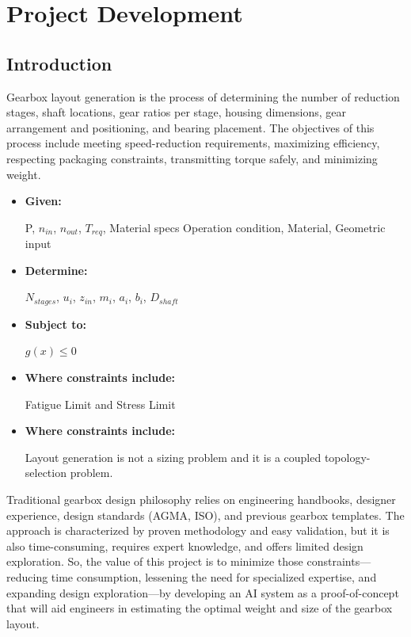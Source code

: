 \chapter{Project Development}
\section{Introduction}
    Gearbox layout generation is the process of determining the number of reduction stages, 
    shaft locations, gear ratios per stage, housing dimensions, gear arrangement and positioning, 
    and bearing placement. The objectives of this process include meeting speed-reduction 
    requirements, maximizing efficiency, respecting packaging constraints, transmitting torque 
    safely, and minimizing weight.

    \begin{itemize}
        \item \textbf{Given:}\par
            P, $n_{in}$, $n_{out}$, $T_{req}$, Material specs
            Operation condition, Material, Geometric input
        \item \textbf{Determine:}\par
            $N_{stages}$, $u_{i}$, $z_{in}$, $m_{i}$, $a_{i}$, $b_{i}$, $D_{shaft}$
        \item \textbf{Subject to:}\par
            $g(x) \le 0$
        \item \textbf{Where constraints include:}\par
            Fatigue Limit and Stress Limit
        \item \textbf{Where constraints include:}\par
            Layout generation is not a sizing problem and it is a coupled topology-selection problem.
    \end{itemize}

    Traditional gearbox design philosophy relies on engineering handbooks, designer experience, 
    design standards (AGMA, ISO), and previous gearbox templates. The approach is characterized by 
    proven methodology and easy validation, but it is also time-consuming, requires expert knowledge, 
    and offers limited design exploration. So, the value of this project is to minimize those 
    constraints—reducing time consumption, lessening the need for specialized expertise, and 
    expanding design exploration—by developing an AI system as a proof-of-concept that will aid 
    engineers in estimating the optimal weight and size of the gearbox layout.

